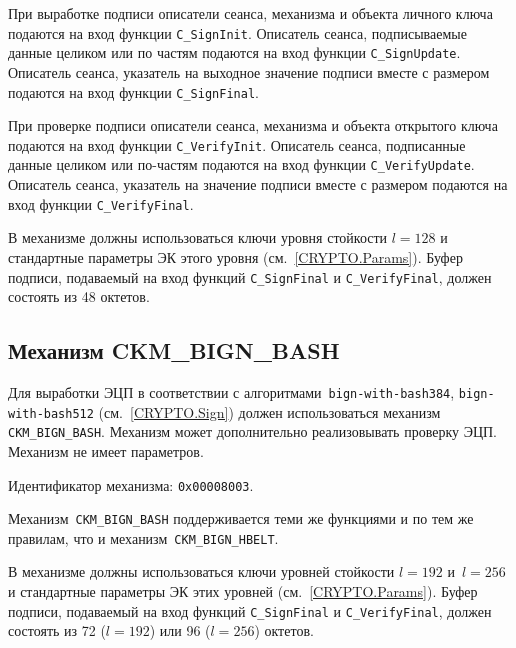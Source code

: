 При выработке подписи описатели сеанса, механизма и объекта
личного ключа подаются на вход функции \verb|C_SignInit|.
Описатель сеанса, подписываемые данные целиком или по частям подаются
на вход функции \verb|C_SignUpdate|.
Описатель сеанса, указатель на выходное значение подписи вместе с размером
подаются на вход функции \verb|C_SignFinal|.

При проверке подписи описатели сеанса, механизма и объекта
открытого ключа подаются на вход функции \verb|C_VerifyInit|.
Описатель сеанса, подписанные данные целиком или по-частям подаются
на вход функции \verb|C_VerifyUpdate|.
Описатель сеанса, указатель на значение подписи вместе с размером
подаются на вход функции \verb|C_VerifyFinal|.

В механизме должны использоваться ключи уровня стойкости $l=128$ 
и стандартные параметры ЭК этого уровня (см.~\ref{CRYPTO.Params}).
% 
Буфер подписи, подаваемый на вход функций \verb|C_SignFinal| и 
\verb|C_VerifyFinal|, должен состоять из 48 октетов.

\subsection{Механизм CKM\_BIGN\_BASH}\label{CRYPTOKI.SignBash}

Для выработки ЭЦП в соответствии с алгоритмами~\texttt{bign-with-bash384},
\texttt{bign-with-bash512} (см.~\ref{CRYPTO.Sign}) должен использоваться 
механизм \verb|CKM_BIGN_BASH|. Механизм может дополнительно реализовывать 
проверку ЭЦП. 
%
Механизм не имеет параметров.

Идентификатор механизма: \texttt{0x00008003}.

Механизм~\verb|CKM_BIGN_BASH| поддерживается теми же функциями и по тем же 
правилам, что и механизм~\verb|CKM_BIGN_HBELT|.

В механизме должны использоваться ключи уровней стойкости $l=192$ и~$l=256$
и стандартные параметры ЭК этих уровней (см.~\ref{CRYPTO.Params}).
% 
Буфер подписи, подаваемый на вход функций \verb|C_SignFinal| и 
\verb|C_VerifyFinal|, должен состоять из 72 ($l=192$) или 96 ($l=256$) 
октетов. 


